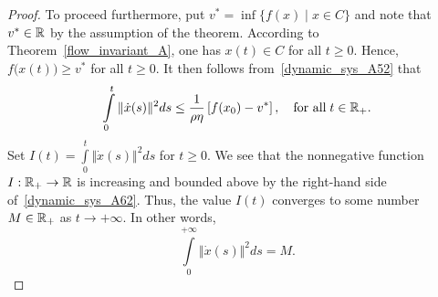 \documentclass[11pt]{article}
\theoremstyle{definition}
\theoremstyle{remark}
\def\R{\Bbb R}
\begin{document}
\begin{proof}
	To proceed furthermore, put $v^*=\inf\{f(x)\mid x\in C\}$ and note that $v^*\in\R$ by the assumption of the theorem. According to Theorem~\ref{flow_invariant_A}, one has $x(t)\in C$ for all $t\geq0$.  Hence, $	f\big(x(t)\big)\geq v^*$ for all $t \geq 0$.  It then follows from~\eqref{dynamic_sys_A52} that	
	\begin{equation}\label{dynamic_sys_A62}
 \int\limits_{0}^{t}\Vert\dot{x}(s)\Vert^2ds \leq\dfrac{1}{\rho\eta}\left[f(x_0)- 	v^*\right],\quad\mbox{\rm for all}\; t\in\R_+.
\end{equation}
Set $I(t) =  \displaystyle\int\limits_{0}^{t}\Vert\dot{x}(s)\Vert^2ds$ for $t\geq 0$. We see that the nonnegative function $I:\R_+\to\R$ is increasing and bounded above by the right-hand side of~\eqref{dynamic_sys_A62}. Thus, the value $I(t)$ converges to some number $M\in\R_+$ as $t\to+\infty$. In other words,
\begin{equation}\label{int_converges}
\int\limits_{0}^{+\infty}\Vert\dot{x}(s)\Vert^2ds=M.
\end{equation}


\end{proof}
\end{document}
